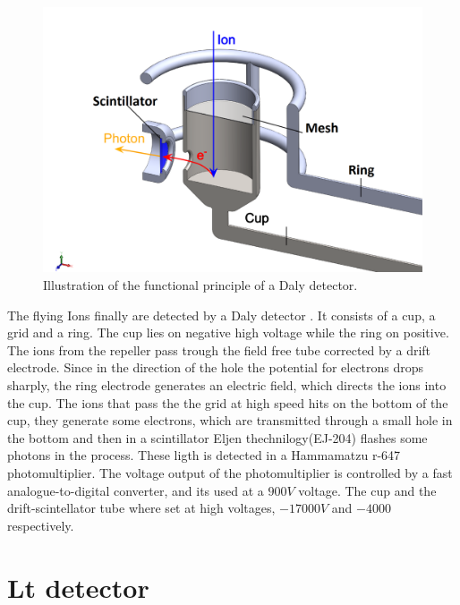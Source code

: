\begin{figure}[hbtp]
\label{img:tofcup}
\centering
\includegraphics[width = 10 cm]{../Images/Cup scintillator.png}
\caption[TOF cup]{Illustration of the functional principle of a Daly detector.}
\end{figure}

The flying Ions finally are detected by a  Daly detector \cite{daly_scintillation_1960}. It consists of a cup, a grid and a ring. The cup lies on negative high voltage while the ring on positive. The ions from the repeller pass trough the field free tube corrected by a drift electrode.  Since in the direction of the hole the potential for electrons drops sharply, the ring electrode generates an electric field, which directs the ions into the cup. The ions that pass the  the grid at high speed hits on the bottom of the cup, they generate some electrons, which are transmitted through a small hole in the bottom and then in a scintillator Eljen thechnilogy(EJ-204) flashes some photons in the process. These ligth is detected in a Hammamatzu r-647 photomultiplier. The voltage output of the photomultiplier is controlled by a fast analogue-to-digital converter, and its used at a $900V$ voltage. The cup and the drift-scintellator  tube where set at high voltages,  $-17000V$ and $-4000$ respectively.

\section{Lt detector}

